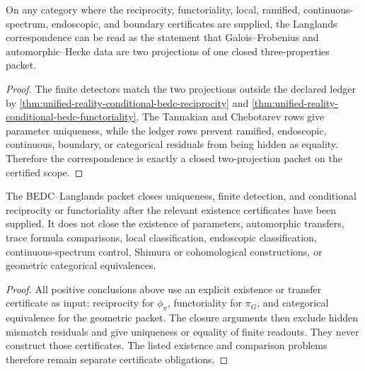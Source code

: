 \begin{corollary}
\label{cor:unified-reality-langlands-two-projection-closure-principle}
On any category where the reciprocity, functoriality, local, ramified,
continuous-spectrum, endoscopic, and boundary certificates are supplied,
the Langlands correspondence can be read as the statement that
Galois--Frobenius and automorphic--Hecke data are two projections of one
closed three-properties packet.
\end{corollary}
\begin{proof}
The finite detectors match the two projections outside the declared
ledger by
\autoref{thm:unified-reality-conditional-bedc-reciprocity} and
\autoref{thm:unified-reality-conditional-bedc-functoriality}. The
Tannakian and Chebotarev rows give parameter uniqueness, while the ledger
rows prevent ramified, endoscopic, continuous, boundary, or categorical
residuals from being hidden as equality. Therefore the correspondence is
exactly a closed two-projection packet on the certified scope.
\end{proof}

\begin{theorem}
\label{thm:unified-reality-langlands-closure-boundary}
The BEDC--Langlands packet closes uniqueness, finite detection, and
conditional reciprocity or functoriality after the relevant existence
certificates have been supplied. It does not close the existence of
parameters, automorphic transfers, trace formula comparisons, local
classification, endoscopic classification, continuous-spectrum control,
Shimura or cohomological constructions, or geometric categorical
equivalences.
\end{theorem}
\begin{proof}
All positive conclusions above use an explicit existence or transfer
certificate as input: reciprocity for $\phi_{\pi}$, functoriality for
$\pi_G$, and categorical equivalence for the geometric packet. The
closure arguments then exclude hidden mismatch residuals and give
uniqueness or equality of finite readouts. They never construct those
certificates. The listed existence and comparison problems therefore
remain separate certificate obligations.
\end{proof}
